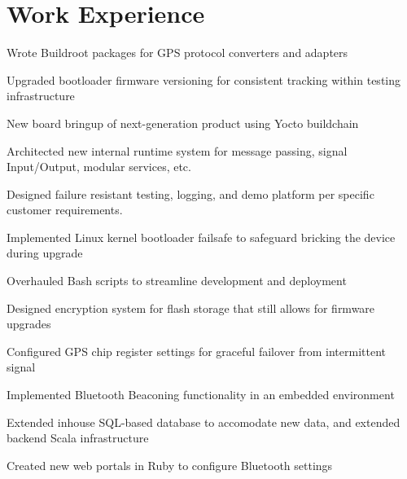 \documentclass[]{resume}
\begin{document}
\begin{minipage}[t]{0.66\textwidth} 


\section{Work Experience}

\vspace{\topsep}
\begin{tightemize}
\item Wrote Buildroot packages for GPS protocol converters and adapters
\item Upgraded bootloader firmware versioning for consistent tracking within testing infrastructure
\item New board bringup of next-generation product using Yocto buildchain
\item Architected new internal runtime system for message passing, signal Input/Output, modular services, etc.
\item Designed failure resistant testing, logging, and demo platform per specific customer requirements.
\end{tightemize}
\sectionsep

\begin{tightemize}
\item Implemented Linux kernel bootloader failsafe to safeguard bricking the device during upgrade
\item Overhauled Bash scripts to streamline development and deployment
\item Designed encryption system for flash storage that still allows for firmware upgrades
\item Configured GPS chip register settings for graceful failover from intermittent signal
\end{tightemize}
\sectionsep

\begin{tightemize}
\item Implemented Bluetooth Beaconing functionality in an embedded environment
\item Extended inhouse SQL-based database to accomodate new data, and extended backend Scala infrastructure
\item Created new web portals in Ruby to configure Bluetooth settings
\end{tightemize}
\sectionsep



\end{minipage}
\end{document}
